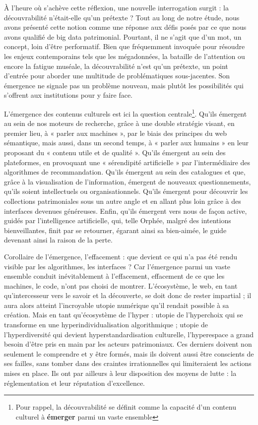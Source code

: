 \documentclass[a4paper,12pt,twoside]{book}
\begin{document}
	
	À l'heure où s'achève cette réflexion, une nouvelle interrogation surgit : la découvrabilité n'était-elle qu'un prétexte ? Tout au long de notre étude, nous avons présenté cette notion comme une réponse aux défis posés par ce que nous avons qualifié de big data patrimonial. Pourtant, il ne s'agit que d'un mot, un concept, loin d’être performatif. Bien que fréquemment invoquée pour résoudre les enjeux contemporains tels que les mégadonnées, la bataille de l'attention ou encore la fatigue muséale, la découvrabilité n’est qu’un prétexte, un point d'entrée pour aborder une multitude de problématiques sous-jacentes. Son émergence ne signale pas un problème nouveau, mais plutôt les possibilités qui s'offrent aux institutions pour y faire face.
	
	L’émergence des contenus culturels est ici la question centrale\footnote{Pour rappel, la découvrabilité se définit comme la capacité d'un contenu culturel à \textbf{émerger} parmi un vaste ensemble}. Qu’ils émergent au sein de nos moteurs de recherche, grâce à une double stratégie visant, en premier lieu, à « parler aux machines », par le biais des principes du web sémantique, mais aussi, dans un second temps, à « parler aux humains » en leur proposant du « contenu utile et de qualité ». Qu’ils émergent au sein des plateformes, en provoquant une « sérendipité artificielle » par l’intermédiaire des algorithmes de recommandation. Qu’ils émergent au sein des catalogues et que, grâce à la visualisation de l’information, émergent de nouveaux questionnements, qu’ils soient intellectuels ou organisationnels. Qu’ils émergent pour découvrir les collections patrimoniales sous un autre angle et en allant plus loin grâce à des interfaces devenues généreuses. Enfin, qu’ils émergent vers nous de façon active, guidés par l’intelligence artificielle, qui, telle Orphée, malgré des intentions bienveillantes, finit par se retourner, égarant ainsi sa bien-aimée, le guide devenant ainsi la raison de la perte.
	
	Corollaire de l’émergence, l’effacement : que devient ce qui n’a pas été rendu visible par les algorithmes, les interfaces ? Car l’émergence parmi un vaste ensemble conduit inévitablement à l’effacement, effacement de ce que les machines, le code, n’ont pas choisi de montrer. L’écosystème, le web, en tant qu’intercesseur vers le savoir et la découverte, se doit donc de rester impartial ; il aura alors atteint l’incroyable utopie numérique qu’il rendait possible à sa création. Mais en tant qu’écosystème de l’hyper : utopie de l’hyperchoix qui se transforme en une hyperindividualisation algorithmique ; utopie de l’hyperdiversité qui devient hyperstandardisation culturelle, l’hyperespace a grand besoin d’être pris en main par les acteurs patrimoniaux. Ces derniers doivent non seulement le comprendre et y être formés, mais ils doivent aussi être conscients de ses failles, sans tomber dans des craintes irrationnelles qui limiteraient les actions mises en place. Ils ont par ailleurs à leur disposition des moyens de lutte : la réglementation et leur réputation d’excellence.
	
\end{document}
